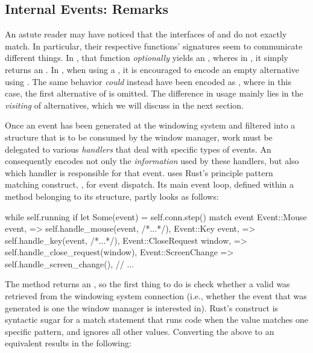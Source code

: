 \subsection{Internal Events: Remarks}

An astute reader may have noticed that the  interfaces of
\wmrs and \wmcpp do not exactly match. In particular, their respective
 functions' signatures seem to communicate different things. In
\wmrs, that function \textit{optionally} yields an , wheres
in \wmcpp, it simply returns an . In \cpp, when using a
, it is encouraged to encode an empty alternative using
\cite{cppstd}. The same behavior \textit{could} instead
have been encoded as , where in this case, the first
alternative of  is omitted. The difference in usage mainly lies in
the \textit{visiting} of  alternatives, which we will discuss in
the next section.


Once an event has been generated at the windowing system and filtered into a
structure that is to be consumed by the window manager, work must be delegated
to various \textit{handlers} that deal with specific types of events. An
 consequently encodes not only the \textit{information} used by these
handlers, but also which handler is responsible for that event. \wmrs uses
Rust's principle pattern matching construct, , for event dispatch.
Its main event loop, defined within a method belonging to its 
structure, partly looks as follows:

\begin{rustblock}
  while self.running {
    if let Some(event) = self.conn.step() {
      match event {
        Event::Mouse { event, }
          => self.handle_mouse(event, /*...*/),
        Event::Key { event, }
          => self.handle_key(event, /*...*/),
        Event::CloseRequest { window, }
          => self.handle_close_request(window),
        Event::ScreenChange
          => self.handle_screen_change(),
        // ...
      }
    }
  }
\end{rustblock}

The  method returns an , so the first thing to do
is check whether a valid  was retrieved from the windowing system
connection (i.e., whether the event that was generated is one the window manager
is interested in). Rust's  construct is syntactic sugar for a
match statement that runs code when the value matches one specific pattern, and
ignores all other values\cite{therustbook}. Converting the above 
to an equivalent  results in the following:

